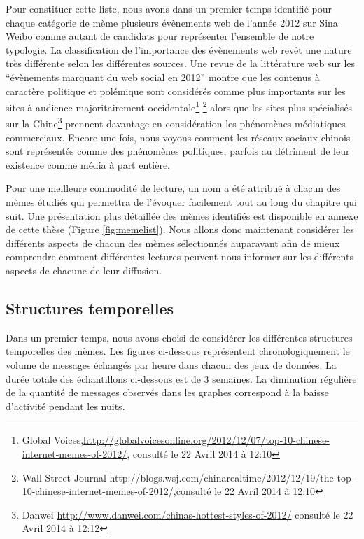 Pour constituer cette liste, nous avons dans un premier temps identifié pour chaque catégorie de mème plusieurs évènements web de l{\textquoteright}année 2012 sur Sina Weibo comme autant de candidats pour représenter l{\textquoteright}ensemble de notre typologie. La classification de l{\textquoteright}importance des évènements web rev\^et une nature très différente selon les différentes sources. Une revue de la littérature web sur les {\textquotedblleft}évènements marquant du web social en 2012{\textquotedblright} montre que les contenus à caractère politique et polémique sont considérés comme plus importants sur les sites à audience majoritairement occidentale\footnote{Global Voices,\url{http://globalvoicesonline.org/2012/12/07/top-10-chinese-internet-memes-of-2012/}, consulté le 22 Avril 2014 à 12:10} \footnote{ Wall Street Journal http://blogs.wsj.com/chinarealtime/2012/12/19/the-top-10-chinese-internet-memes-of-2012/,consulté le 22 Avril 2014 à 12:10 } alors que les sites plus spécialisés sur la Chine\footnote{ Danwei \url{http://www.danwei.com/chinas-hottest-styles-of-2012/} consulté le 22 Avril 2014 à 12:12} prennent davantage en considération les phénomènes médiatiques commerciaux. Encore une fois, nous voyons comment les réseaux sociaux chinois sont représentés comme des phénomènes politiques, parfois au détriment de leur existence comme média à part entière. 

Pour une meilleure commodit\'e de lecture, un nom a \'et\'e attribu\'e \`a chacun des m\`emes \'etudi\'es qui permettra de l{\textquoteright}\'evoquer facilement tout au long du chapitre qui suit. Une pr\'esentation plus d\'etaill\'ee des m\`emes identifiés est disponible en annexe de cette th\`ese (Figure \ref{fig:memelist}). Nous allons donc maintenant consid\'erer les diff\'erents aspects de chacun des m\`emes s\'electionn\'es auparavant afin de mieux comprendre comment diff\'erentes lectures peuvent nous informer sur les diff\'erents aspects de chacune de leur diffusion. 


\subsection[Structures temporelles]{Structures temporelles}
Dans un premier temps, nous avons choisi de consid\'erer les diff\'erentes structures temporelles des m\`emes. Les figures ci-dessous repr\'esentent chronologiquement le volume de messages \'echang\'es par heure dans chacun des jeux de donn\'ees. La dur\'ee totale des \'echantillons ci-dessous est de 3 semaines. La diminution r\'eguli\`ere de la quantit\'e de messages observ\'es dans les graphes correspond \`a la baisse d{\textquoteright}activit\'e pendant les nuits. 

